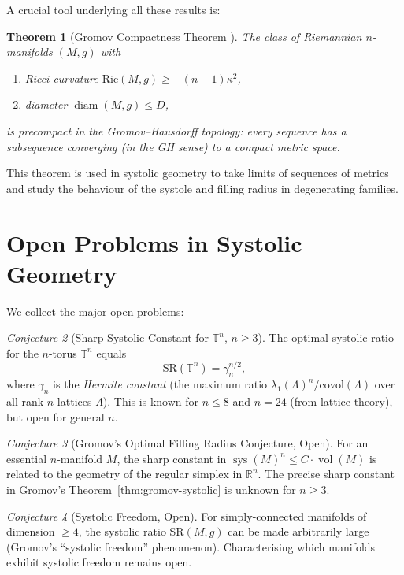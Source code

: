 \documentclass[12pt,a4paper]{amsart}
\newtheorem{theorem}{Theorem}[section]
\theoremstyle{definition}
\theoremstyle{remark}
\newtheorem{conjecture}[theorem]{Conjecture}
\DeclareMathOperator{\sys}{sys}
\DeclareMathOperator{\vol}{vol}
\DeclareMathOperator{\diam}{diam}
\newcommand{\RR}{\mathbb{R}}
\newcommand{\TT}{\mathbb{T}}
\begin{document}
A crucial tool underlying all these results is:

\begin{theorem}[Gromov Compactness Theorem \cite{Gromov1981}]
The class of Riemannian $n$-manifolds $(M,g)$ with
\begin{enumerate}[label=(\roman*)]
  \item Ricci curvature $\mathrm{Ric}(M,g) \ge -(n-1)\kappa^2$,
  \item diameter $\diam(M,g) \le D$,
\end{enumerate}
is precompact in the Gromov--Hausdorff topology: every sequence has a
subsequence converging (in the GH sense) to a compact metric space.
\end{theorem}

This theorem is used in systolic geometry to take limits of sequences of
metrics and study the behaviour of the systole and filling radius in
degenerating families.

\section{Open Problems in Systolic Geometry}

We collect the major open problems:

\begin{conjecture}[Sharp Systolic Constant for $\TT^n$, $n \ge 3$]
The optimal systolic ratio for the $n$-torus $\TT^n$ equals
\[
  \mathrm{SR}(\TT^n) = \gamma_n^{n/2},
\]
where $\gamma_n$ is the \emph{Hermite constant} (the maximum ratio
$\lambda_1(\Lambda)^n/\mathrm{covol}(\Lambda)$ over all rank-$n$ lattices
$\Lambda$).  This is known for $n \le 8$ and $n = 24$ (from lattice theory),
but open for general $n$.
\end{conjecture}

\begin{conjecture}[Gromov's Optimal Filling Radius Conjecture, Open]
For an essential $n$-manifold $M$, the sharp constant in
$\sys(M)^n \le C \cdot \vol(M)$ is related to the geometry of the
regular simplex in $\RR^n$.  The precise sharp constant in Gromov's
Theorem~\ref{thm:gromov-systolic} is unknown for $n \ge 3$.
\end{conjecture}

\begin{conjecture}[Systolic Freedom, Open]
For simply-connected manifolds of dimension $\ge 4$, the systolic
ratio $\mathrm{SR}(M,g)$ can be made arbitrarily large (Gromov's
``systolic freedom'' phenomenon).  Characterising which manifolds
exhibit systolic freedom remains open.
\end{conjecture}
\end{document}
